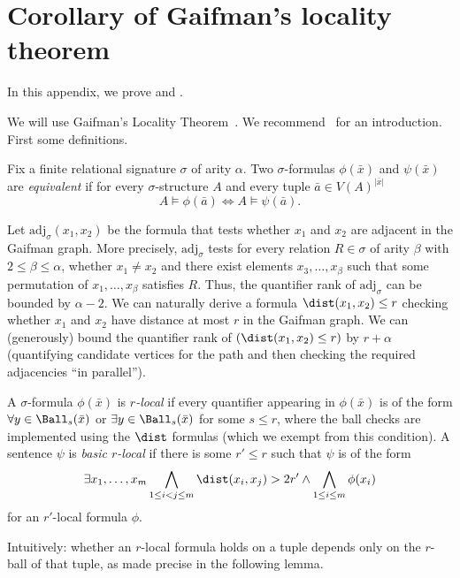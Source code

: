 \section{Corollary of Gaifman's locality theorem}\label{app:gaifman}
In this appendix, we prove  and .

\newcommand{\adj}{\mathrm{adj}}

We will use Gaifman's Locality Theorem~\cite{gaifman}.
We recommend~\cite[Section~4.1]{logic-graphs-algorithms} for an introduction.
First some definitions.

Fix a finite relational signature $\sigma$ of arity $\alpha$.
Two $\sigma$-formulas $\phi(\bar x)$ and $\psi(\bar x)$ are \emph{equivalent} if for every $\sigma$-structure $A$ and every tuple $\bar a \in V(A)^{|\bar x|}$
    \[
    A\models \phi(\bar a) \Leftrightarrow A \models \psi(\bar a).
    \]

Let $\adj_\sigma(x_1,x_2)$ be the formula that tests whether $x_1$ and $x_2$ are adjacent in the Gaifman graph.
More precisely, $\adj_\sigma$ tests for every  relation $R \in \sigma$ of arity $\beta$ with $2\le\beta \leq \alpha$, whether $x_1\neq x_2$ and there exist elements $x_3, \ldots, x_\beta$ such that some permutation of $x_1, \ldots, x_\beta$ satisfies $R$.
Thus, the quantifier rank of $\adj_\sigma$ can be bounded by $\alpha - 2$.
We can naturally derive a formula $\dist(x_1,x_2) \leq r$ checking whether $x_1$ and $x_2$ have distance at most $r$ in the Gaifman graph.
We can (generously) bound the quantifier rank of $(\dist(x_1,x_2) \leq r)$ by $r + \alpha$ (quantifying candidate vertices for the path and then checking the required adjacencies ``in parallel'').

A $\sigma$-formula $\phi(\bar x)$ is \emph{$r$-local}
if every quantifier appearing in $\phi(\bar x)$ is of the form \mbox{$\forall y \in \Ball_s(\bar x)$} or $\exists y \in \Ball_s(\bar x)$ for some $s \leq r$, where the ball checks are implemented using the $\dist$ formulas (which we exempt from this condition).
A sentence $\psi$ is \emph{basic $r$-local} if there is some $r' \leq r$ such that $\psi$ is of the form
\[
  \exists x_1, \ldots, x_m \bigwedge_{1 \leq i < j \leq m} \dist(x_i,x_j) > 2r'
  \wedge
  \bigwedge_{1 \leq i \leq m} \phi(x_i)
\]
for an $r'$-local formula $\phi$.

Intuitively: whether an $r$-local formula holds on a tuple depends only on the $r$-ball of that tuple, as made precise in the following lemma.

